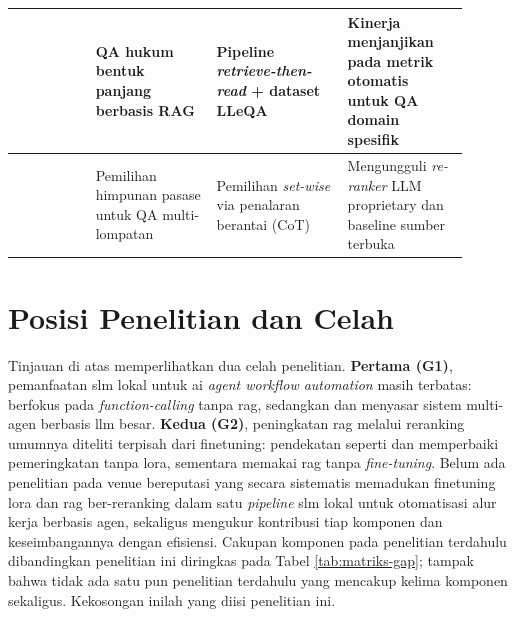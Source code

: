\begin{longtable}{p{0.16\linewidth} p{0.24\linewidth} p{0.26\linewidth} p{0.24\linewidth}}
    \citet{louis2024legalqa} &
    QA hukum bentuk panjang berbasis RAG &
    Pipeline \textit{retrieve-then-read} + dataset LLeQA &
    Kinerja menjanjikan pada metrik otomatis untuk QA domain spesifik \\
    \hline

    \citet{lee2025setr} &
    Pemilihan himpunan pasase untuk QA multi-lompatan &
    Pemilihan \textit{set-wise} via penalaran berantai (CoT) &
    Mengungguli \textit{re-ranker} LLM proprietary dan baseline sumber terbuka \\
    \hline

\end{longtable}

\section{Posisi Penelitian dan Celah}
Tinjauan di atas memperlihatkan dua celah penelitian. \textbf{Pertama (G1)}, pemanfaatan \gls{slm} lokal untuk \gls{ai} \textit{agent workflow automation} masih terbatas: \citet{erdogan2024tinyagent} berfokus pada \textit{function-calling} tanpa \gls{rag}, sedangkan \citet{niu2025flow} dan \citet{han2026legomem} menyasar sistem multi-agen berbasis \gls{llm} besar. \textbf{Kedua (G2)}, peningkatan \gls{rag} melalui \gls{reranking} umumnya diteliti terpisah dari \gls{finetuning}: pendekatan seperti \citet{yu2024rankrag} dan \citet{lee2025setr} memperbaiki pemeringkatan tanpa \gls{lora}, sementara \citet{saha2024quimrag} memakai \gls{rag} tanpa \textit{fine-tuning}. Belum ada penelitian pada venue bereputasi yang secara sistematis memadukan \gls{finetuning} \gls{lora} dan \gls{rag} ber-\gls{reranking} dalam satu \textit{pipeline} \gls{slm} lokal untuk otomatisasi alur kerja berbasis agen, sekaligus mengukur kontribusi tiap komponen dan keseimbangannya dengan efisiensi. Cakupan komponen pada penelitian terdahulu dibandingkan penelitian ini diringkas pada Tabel \ref{tab:matriks-gap}; tampak bahwa tidak ada satu pun penelitian terdahulu yang mencakup kelima komponen sekaligus. Kekosongan inilah yang diisi penelitian ini.

